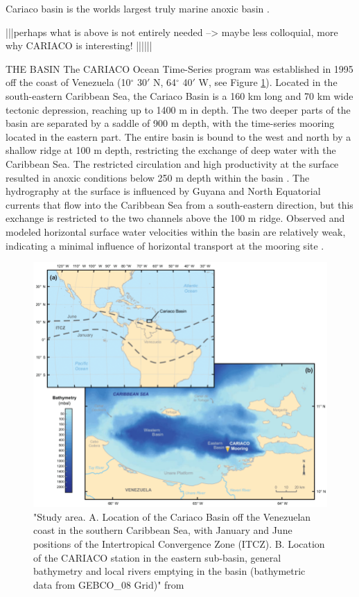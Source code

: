 Cariaco basin is the worlds largest truly marine anoxic basin \citep{Wakeham2012}.


|||perhaps what is above is not entirely needed --> maybe less colloquial, more why CARIACO is interesting! ||||||

THE BASIN
The CARIACO Ocean Time-Series program was established in 1995 off the coast of Venezuela (10$^\circ$ 30$'$ N, 64$^\circ$ 40$'$ W, see Figure \ref{CARIACO-map}). Located in the south-eastern Caribbean Sea, the Cariaco Basin is a 160 km long and 70 km wide tectonic depression, reaching up to 1400 m in depth. The two deeper parts of the basin are separated by a saddle of 900 m depth, with the time-series mooring located in the eastern part. The entire basin is bound to the west and north by a shallow ridge at 100 m depth, restricting the exchange of deep water with the Caribbean Sea. The restricted circulation and high productivity at the surface resulted in anoxic conditions below 250 m depth within the basin \citep{Richards1956}. The hydrography at the surface is influenced by Guyana and North Equatorial currents that flow into the Caribbean Sea from a south-eastern direction, but this exchange is restricted to the two channels above the 100 m ridge. Observed and modeled horizontal surface water velocities within the basin are relatively weak, indicating a minimal influence of horizontal transport at the mooring site \citep{Alvera-Azcarate2009}. 

\begin{figure}
\centering
\includegraphics[trim = 0mm 0mm 0mm 0mm, clip, width=1.\linewidth]{./Chp1-Intro/CARIACObasinMAP_Bringueetal2018.png}
\caption[Scheme]{\small {"Study area. A. Location of the Cariaco Basin off the Venezuelan coast in the southern Caribbean Sea, with January and June positions of the Intertropical Convergence Zone (ITCZ). B. Location of the CARIACO station in the eastern sub-basin, general bathymetry and local rivers emptying in the basin (bathymetric data from GEBCO\_08 Grid)" from \cite{Bringue2019}}}
\label{CARIACO-map}
\end{figure}


